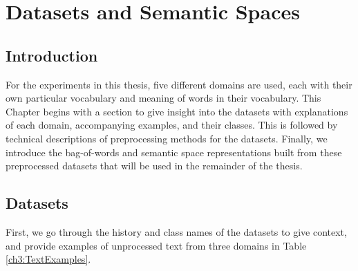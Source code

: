 \chapter{Datasets and Semantic Spaces}\label{ch2.5}


\section{Introduction}\label{chapter3:datasets}


For the experiments in this thesis, five different domains are used, each with their own particular vocabulary and meaning of words in their vocabulary. %
 This Chapter begins with a section to give insight into the datasets with explanations of each domain, accompanying examples, and their classes. This is followed by technical descriptions of preprocessing methods for the datasets. Finally, we introduce the bag-of-words and semantic space representations built from these preprocessed datasets that will be used in the remainder of the thesis.

\section{Datasets}\label{data:datasets}

First, we go through the history and class names of the datasets to give context, and provide examples of unprocessed text from three domains in Table \ref{ch3:TextExamples}. 

